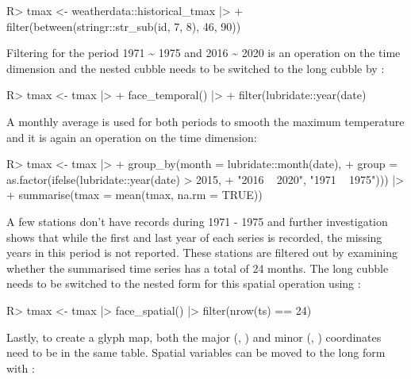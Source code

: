 \documentclass[
]{jss}
\begin{document}
\begin{CodeChunk}
\begin{CodeInput}
R> tmax <- weatherdata::historical_tmax |>
+   filter(between(stringr::str_sub(id, 7, 8), 46, 90))
\end{CodeInput}
\end{CodeChunk}

Filtering for the period 1971 \textasciitilde{} 1975 and 2016
\textasciitilde{} 2020 is an operation on the time dimension and the
nested cubble needs to be switched to the long cubble by
:

\begin{CodeChunk}
\begin{CodeInput}
R> tmax <- tmax |> 
+   face_temporal() |>
+   filter(lubridate::year(date) %
\end{CodeInput}
\end{CodeChunk}

A monthly average is used for both periods to smooth the maximum
temperature and it is again an operation on the time dimension:

\begin{CodeChunk}
\begin{CodeInput}
R> tmax <- tmax |>
+   group_by(month = lubridate::month(date), 
+          group = as.factor(ifelse(lubridate::year(date) > 2015, 
+                                   "2016 ~ 2020", "1971 ~ 1975"))) |>
+   summarise(tmax = mean(tmax, na.rm = TRUE))
\end{CodeInput}
\end{CodeChunk}

A few stations don't have records during 1971 - 1975 and further
investigation shows that while the first and last year of each series is
recorded, the missing years in this period is not reported. These
stations are filtered out by examining whether the summarised time
series has a total of 24 months. The long cubble needs to be switched to
the nested form for this spatial operation using :

\begin{CodeChunk}
\begin{CodeInput}
R> tmax <- tmax |> face_spatial() |> filter(nrow(ts) == 24) 
\end{CodeInput}
\end{CodeChunk}

Lastly, to create a glyph map, both the major (,
) and minor (, ) coordinates need
to be in the same table. Spatial variables can be moved to the long form
with :
\end{document}
